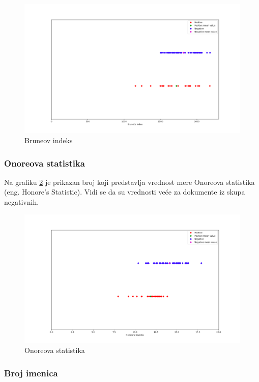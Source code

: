 \documentclass[12pt,oneside]{memoir}
\begin{document}
\begin{figure}[ht!]
\centering
\includegraphics[width=.9\textwidth]{images/r.png}
\caption{ Bruneov indeks }
\label{img:r}
\end{figure}

\FloatBarrier

\subsubsection{Onoreova statistika}

Na grafiku \ref{img:w} je prikazan broj koji predstavlja vrednost mere Onoreova statistika (eng.  Honore's Statistic).  Vidi se da su vrednosti veće za dokumente iz skupa negativnih.

\begin{figure}[ht!]
\centering
\includegraphics[width=.9\textwidth]{images/w.png}
\caption{ Onoreova statistika }
\label{img:w}
\end{figure}

\FloatBarrier

\subsubsection{Broj imenica}
\end{document}
